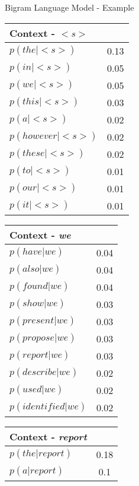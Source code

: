 \begin{frame}{Bigram Language Model - Example}
	\small

	\begin{minipage}{0.32\linewidth}
		\begin{tabular}{|lc|}
			\hline
			Context - \textit{\textbf{$<s>$}}&\\
			\hline
			$p( the | <s> )$ & 0.13 \\
			$p( in | <s> )$ & 0.05 \\
			$p( we | <s> )$ & 0.05 \\
			$p( this | <s> )$ & 0.03 \\
			$p( a | <s> )$ & 0.02 \\
			$p( however | <s> )$ & 0.02 \\
			$p( these | <s> )$ & 0.02 \\
			$p( to | <s> )$ & 0.01 \\
			$p( our | <s> )$ & 0.01 \\
			$p( it | <s> )$ & 0.01 \\
			\hline
		\end{tabular}
	\end{minipage}
	\begin{minipage}{0.32\linewidth}
		\begin{tabular}{|lc|}
			\hline
			Context - \textit{\textbf{we}}&\\
			\hline
			$p( have | we )$ & 0.04 \\
			$p( also | we )$ & 0.04 \\
			$p( found | we )$ & 0.04 \\
			$p( show | we )$ & 0.03 \\
			$p( present | we )$ & 0.03 \\
			$p( propose | we )$ & 0.03 \\
			$p( report | we )$ & 0.03 \\
			$p( describe | we )$ & 0.02 \\
			$p( used | we )$ & 0.02 \\
			$p( identified | we )$ & 0.02 \\
			\hline
		\end{tabular}
	\end{minipage}
	\begin{minipage}{0.32\linewidth}
		\begin{tabular}{|lc|}
			\hline
			Context - \textit{\textbf{report}}&\\
			\hline
			$p( the | report )$ & 0.18 \\
			$p( a | report )$ & 0.1 \\

\end{tabular}
\end{minipage}
\end{frame}
